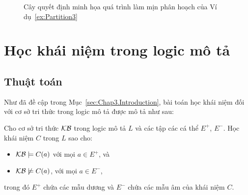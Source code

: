 \begin{figure}[h!]
	\caption{Cây quyết định minh họa quá trình làm mịn phân hoạch của Ví dụ~\ref{ex:Partition3}\label{fig:DecisionTree3}}
\end{figure}

\section{Học khái niệm trong logic mô tả}
\label{sec:Chap3.ConceptLearning}
\subsection{Thuật toán \BBCLearnS}
\label{sec:Chap3.BBCL2}

Như đã đề cập trong Mục~\ref{sec:Chap3.Introduction}, bài toán học khái niệm đối với cơ sở tri thức trong logic mô tả được mô tả như sau: 

Cho cơ sở tri thức $\mathcal{KB}$ trong logic mô tả $L$ và các tập các cá thể $E^+$, $E^-$. Học khái niệm $C$ trong $L$ sao cho:
\begin{itemize}
	\item $\mathcal{KB} \models C(a)$ với mọi $a \in E^+$, và
	\item $\mathcal{KB} \not\models C(a)$, với mọi $a \in E^-$,
\end{itemize}
trong đó $E^+$ chứa các mẫu dương và $E^-$ chứa các mẫu âm của khái niệm $C$.

